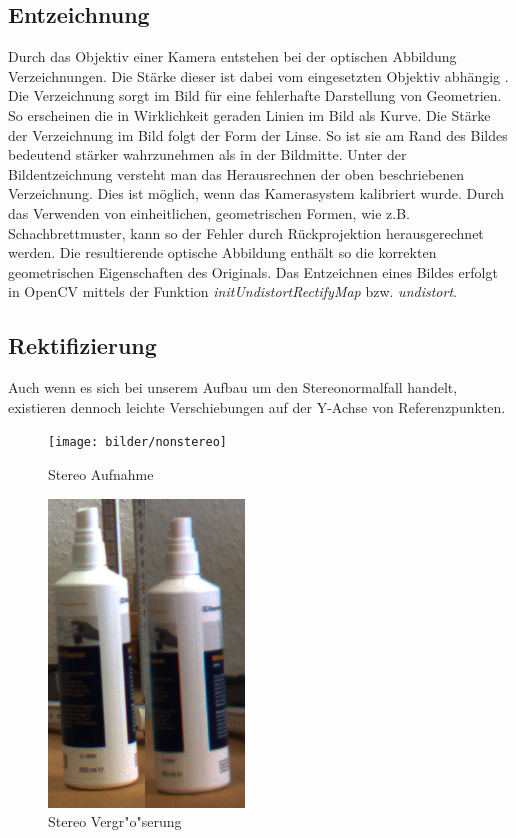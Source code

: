 \subsection{Entzeichnung}
\label{sec:entzeichnung}

Durch das Objektiv einer Kamera entstehen bei der optischen Abbildung Verzeichnungen. Die Stärke dieser ist dabei vom eingesetzten Objektiv abhängig \cite{wie}. Die Verzeichnung sorgt im Bild für eine fehlerhafte Darstellung von Geometrien. So erscheinen die in Wirklichkeit geraden Linien im Bild als Kurve.
Die Stärke der Verzeichnung im Bild folgt der Form der Linse. So ist sie am Rand des Bildes bedeutend stärker wahrzunehmen als in der Bildmitte.\newline
\noindent Unter der Bildentzeichnung versteht man das Herausrechnen der oben beschriebenen Verzeichnung. Dies ist möglich, wenn das Kamerasystem kalibriert wurde. Durch das Verwenden von einheitlichen, geometrischen Formen, wie z.B. Schachbrettmuster, kann so der Fehler durch Rückprojektion herausgerechnet werden. Die resultierende optische Abbildung enthält so die korrekten geometrischen Eigenschaften des Originals. Das Entzeichnen eines Bildes erfolgt in OpenCV mittels der Funktion \textit{initUndistortRectifyMap} bzw. \textit{undistort}.

\subsection{Rektifizierung}
\label{sec:rektifizierung}

\noindent Auch wenn es sich bei unserem Aufbau um den Stereonormalfall handelt, existieren dennoch leichte Verschiebungen auf der Y-Achse von Referenzpunkten.

\begin{figure}[H]
	\texttt{[image: bilder/nonstereo]}
	\caption[Stereo Szenenaufnahme]{Stereo Aufnahme}
	\label{fig:steresene}%
\end{figure}

\begin{figure}[H]
	\includegraphics[scale=0.4]{bilder/nonparallal}
	\caption[Stereo Vergr"o"serung]{Stereo Vergr"o"serung}
	\label{fig:vergr}%
\end{figure}

